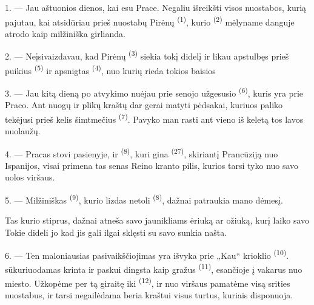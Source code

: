 \VUsaut{4.0mm}
\VUsaut{3.0mm}

\VUsaut{3.0mm}

\VUsaut{3.0mm}

1. --- Jau aštuonios dienos, kai esu Prace. Negaliu išreikšti visos nuostabos, kurią
pajutau, kai atsidūriau prieš nuostabų Pirėnų  \textsuperscript{(1)},
kurio  \textsuperscript{(2)} mėlyname danguje atrodo kaip milžiniška
girlianda.

2. --- Neįsivaizdavau, kad Pirėnų  \textsuperscript{(3)} siekia tokį
didelį  ir likau apstulbęs prieš puikius 
\textsuperscript{(5)} ir apsnigtas  \textsuperscript{(4)}, nuo
kurių rieda tokios baisios 

\VUsaut{3.0mm}
\VUsaut{3.0mm}

3. --- Jau kitą dieną po atvykimo nuėjau prie senojo užgesusio 
\textsuperscript{(6)}, kuris yra prie Praco. Ant nuogų ir plikų 
kraštų dar gerai matyti pėdsakai, kuriuos paliko  tekėjusi prieš
kelis šimtmečius  \textsuperscript{(7)}. Pavyko man rasti ant
vieno iš  keletą tos lavos nuolaužų.

4. --- Pracas stovi pasienyje, ir  \textsuperscript{(8)}, kuri gina
 \textsuperscript{(27)}, skiriantį Prancūziją nuo Ispanijos, visai
primena tas senas Reino kranto pilis, kurios tarsi tyko  nuo savo
uolos viršaus.

5. --- Milžiniškas  \textsuperscript{(9)}, kurio lizdas netoli
 \textsuperscript{(8)}, dažnai patraukia mano dėmesį.

Tas  kurio  stiprus, dažnai atneša savo
jaunikliams ėriuką ar ožiuką, kurį laiko savo  Tokie dideli jo
 kad jis gali ilgai sklęsti su savo sunkia našta.

\VUsaut{3.0mm}
\VUsaut{3.0mm}

6. --- Ten maloniausias pasivaikščiojimas yra išvyka prie „Kau“ krioklio
\textsuperscript{(10)}.  sūkuriuodamas krinta ir paskui dingsta
kaip gražus   \textsuperscript{(11)}, esančioje
į vakarus nuo miesto. Užkopėme per tą giraitę iki 
\textsuperscript{(12)}, ir nuo  viršaus pamatėme visą
srities   nuostabus, ir  tarsi
negailėdama beria kraštui visus turtus, kuriais disponuoja.

